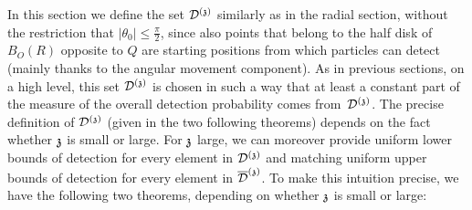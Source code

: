 
In this section we define the set $\dt$ similarly as in the radial section, without the restriction that $|\theta_0| \le \tfrac{\pi}{2}$, since also points that belong to the half disk of $B_O(R)$ opposite to $Q$ are starting positions from which particles can detect (mainly thanks to the angular movement component). As in previous sections, on a high level, this set $\dt$ is chosen in such a way that at least a constant part of the measure of the overall detection probability comes from~$\dt$. The precise definition of $\dt$ (given in the two following theorems) depends on the fact whether $\ss$ is small or large. For $\ss$ large, we can moreover provide uniform lower bounds of detection for every element in $\dt$ and matching uniform upper bounds of detection for every element in $\ndt$. To make this intuition precise, we have the following two theorems, depending on whether $\ss$ is small or large: 

